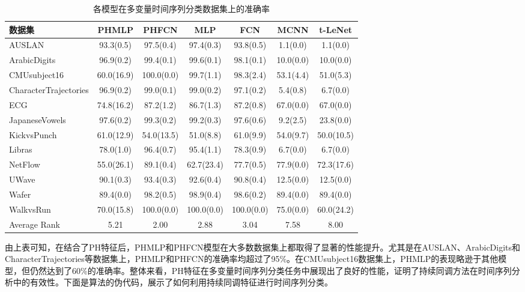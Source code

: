 \begin{table}[h!]
    \centering
    \caption{各模型在多变量时间序列分类数据集上的准确率}
    \label{tab:model_performance_multivariate_tsc}
    \begin{tabular}{lcccccc}
        \toprule
        \textbf{数据集}          & \textbf{PHMLP} & \textbf{PHFCN} & \textbf{MLP} & \textbf{FCN} & \textbf{MCNN} & \textbf{t-LeNet} \\ %
        \midrule
        AUSLAN                & 93.3(0.5)      & 97.5(0.4)      & 97.4(0.3)    & 93.8(0.5)    & 1.1(0.0)      & 1.1(0.0)         \\
        ArabicDigits          & 96.9(0.2)      & 99.4(0.1)      & 99.6(0.1)    & 98.1(0.1)    & 10.0(0.0)     & 10.0(0.0)        \\
        CMUsubject16          & 60.0(16.9)     & 100.0(0.0)     & 99.7(1.1)    & 98.3(2.4)    & 53.1(4.4)     & 51.0(5.3)        \\
        CharacterTrajectories & 96.9(0.2)      & 99.0(0.1)      & 99.0(0.2)    & 97.1(0.2)    & 5.4(0.8)      & 6.7(0.0)         \\
        ECG                   & 74.8(16.2)     & 87.2(1.2)      & 86.7(1.3)    & 87.2(0.8)    & 67.0(0.0)     & 67.0(0.0)        \\
        JapaneseVowels        & 97.6(0.2)      & 99.3(0.2)      & 99.2(0.3)    & 97.6(0.6)    & 9.2(2.5)      & 23.8(0.0)        \\
        KickvsPunch           & 61.0(12.9)     & 54.0(13.5)     & 51.0(8.8)    & 61.0(9.9)    & 54.0(9.7)     & 50.0(10.5)       \\
        Libras                & 78.0(1.0)      & 96.4(0.7)      & 95.4(1.1)    & 78.3(0.9)    & 6.7(0.0)      & 6.7(0.0)         \\
        NetFlow               & 55.0(26.1)     & 89.1(0.4)      & 62.7(23.4)   & 77.7(0.5)    & 77.9(0.0)     & 72.3(17.6)       \\
        UWave                 & 90.1(0.3)      & 93.4(0.3)      & 92.6(0.4)    & 90.8(0.4)    & 12.5(0.0)     & 12.5(0.0)        \\
        Wafer                 & 89.4(0.0)      & 98.2(0.5)      & 98.9(0.4)    & 98.6(0.2)    & 89.4(0.0)     & 89.4(0.0)        \\
        WalkvsRun             & 70.0(15.8)     & 100.0(0.0)     & 100.0(0.0)   & 100.0(0.0)   & 75.0(0.0)     & 60.0(24.2)       \\
        \midrule
        Average Rank          & 5.21           & 2.00           & 2.88         & 3.04         & 7.58          & 8.00             \\
        \bottomrule
    \end{tabular}
\end{table}
由上表可知，在结合了PH特征后，PHMLP和PHFCN模型在大多数数据集上都取得了显著的性能提升。尤其是在AUSLAN、ArabicDigits和CharacterTrajectories等数据集上，PHMLP和PHFCN的准确率均超过了95\%。在CMUsubject16数据集上，PHMLP的表现略逊于其他模型，但仍然达到了60\%的准确率。整体来看，PH特征在多变量时间序列分类任务中展现出了良好的性能，证明了持续同调方法在时间序列分析中的有效性。下面是算法的伪代码，展示了如何利用持续同调特征进行时间序列分类。

